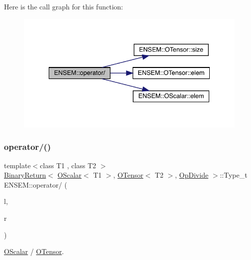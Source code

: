 Here is the call graph for this function\+:\nopagebreak
\begin{figure}[H]
\begin{center}
\leavevmode
\includegraphics[width=335pt]{de/d87/group__obstensor_ga5810ade8421abe1d7a6cf07748ac83d3_cgraph}
\end{center}
\end{figure}
\mbox{\label{group__obstensor_ga7a165136688ba38f4500951758f372d3}} 
\subsubsection{\texorpdfstring{operator/()}{operator/()}\hspace{0.1cm}{\footnotesize\ttfamily [3/3]}}
{\footnotesize\ttfamily template$<$class T1 , class T2 $>$ \\
\mbox{\hyperlink{structENSEM_1_1BinaryReturn}{Binary\+Return}}$<$ \mbox{\hyperlink{classENSEM_1_1OScalar}{O\+Scalar}}$<$ T1 $>$, \mbox{\hyperlink{classENSEM_1_1OTensor}{O\+Tensor}}$<$ T2 $>$, \mbox{\hyperlink{structENSEM_1_1OpDivide}{Op\+Divide}} $>$\+::Type\+\_\+t E\+N\+S\+E\+M\+::operator/ (\begin{DoxyParamCaption}\item[{const \mbox{\hyperlink{classENSEM_1_1OScalar}{O\+Scalar}}$<$ T1 $>$ \&}]{l,  }\item[{const \mbox{\hyperlink{classENSEM_1_1OTensor}{O\+Tensor}}$<$ T2 $>$ \&}]{r }\end{DoxyParamCaption})\hspace{0.3cm}{\ttfamily [inline]}}



\mbox{\hyperlink{classENSEM_1_1OScalar}{O\+Scalar}} / \mbox{\hyperlink{classENSEM_1_1OTensor}{O\+Tensor}}. 

